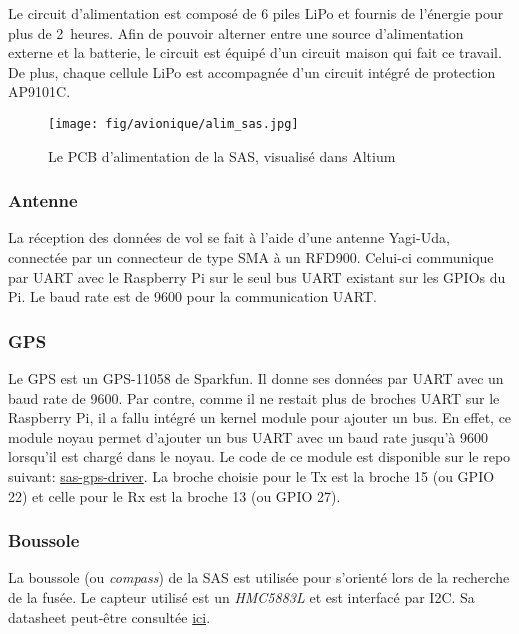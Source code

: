 Le circuit d'alimentation est composé de 6 piles LiPo et fournis de l'énergie
pour plus de 2~heures. Afin de pouvoir alterner entre une source d'alimentation
externe et la batterie, le circuit est équipé d'un circuit maison qui fait ce
travail. De plus, chaque cellule LiPo est accompagnée d'un circuit intégré de
protection AP9101C.

\begin{figure}[H]
	\center
	\texttt{[image: fig/avionique/alim\_sas.jpg]}
	\caption{Le PCB d'alimentation de la SAS, visualisé dans Altium}
	\label{f:alim_sas}
\end{figure}

\subsubsection{Antenne}

La réception des données de vol se fait à l'aide d'une antenne Yagi-Uda,
connectée par un connecteur de type SMA à un RFD900. Celui-ci communique par
UART avec le Raspberry Pi sur le seul bus UART existant sur les GPIOs du Pi. Le
baud rate est de 9600 pour la communication UART.

\subsubsection{GPS}

Le GPS est un GPS-11058 de Sparkfun. Il donne ses données par UART avec un baud
rate de 9600. Par contre, comme il ne restait plus de broches UART sur le
Raspberry Pi, il a fallu intégré un kernel module pour ajouter un bus. En
effet, ce module noyau permet d'ajouter un bus UART avec un baud rate jusqu'à
9600 lorsqu'il est chargé dans le noyau. Le code de ce module est disponible
sur le repo suivant:
\href{https://github.com/ul-gaul/sas-driver-gps}{sas-gps-driver}. La broche
choisie pour le Tx est la broche 15 (ou GPIO 22) et celle pour le Rx est la
broche 13 (ou GPIO 27).

\subsubsection{Boussole}

La boussole (ou \textit{compass}) de la SAS est utilisée pour s'orienté lors de
la recherche de la fusée. Le capteur utilisé est un \textit{HMC5883L} et est
interfacé par I2C. Sa datasheet peut-être consultée
\href{https://cdn-shop.adafruit.com/datasheets/HMC5883L_3-Axis_Digital_Compass_IC.pdf}{ici}.

